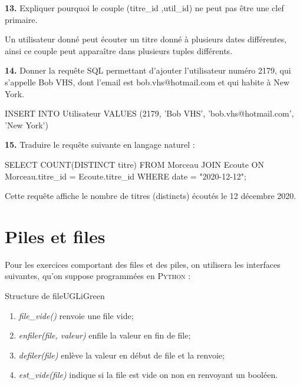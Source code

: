 \documentclass[a4paper,10pt,french]{book}
\begin{document}
    \textbf{13.}	Expliquer pourquoi le couple (titre\_id ,util\_id) ne peut pas être une clef primaire.
    \begin{encadre}[Réponse]
        Un utilisateur donné peut écouter un titre donné à plusieurs dates différentes, ainsi ce couple peut apparaître dans plusieurs tuples différents.
    \end{encadre}
    \textbf{14.}	Donner la requête SQL permettant d’ajouter l’utilisateur numéro 2179, qui s’appelle Bob
    VHS, dont l’email est bob.vhs@hotmail.com et qui habite à New York.
    
    \begin{sql}
        INSERT INTO Utilisateur VALUES 
        (2179, 'Bob VHS', 'bob.vhs@hotmail.com', 'New York')
    \end{sql}
    \textbf{15.}	Traduire le requête suivante en langage naturel :
    \begin{sql}
        SELECT COUNT(DISTINCT titre) FROM Morceau
        JOIN Ecoute ON Morceau.titre_id = Ecoute.titre_id 
        WHERE date = "2020-12-12";
  
    \end{sql}  
    \begin{encadre}[Réponse]
        Cette requête affiche le nombre de titres (distincts) écoutés le 12 décembre 2020.
    \end{encadre}


\section*{Piles et files}

Pour les exercices comportant des files et des piles, on utilisera les interfaces suivantes, qu'on suppose programmées en \textsc{Python} : 

\begin{encadrecolore}{Structure de file}{UGLiGreen}
    \begin{enumerate}[--]
        \item \textit{file\_vide()} renvoie une file vide;
        \item \textit{enfiler(file, valeur)} enfile la valeur en fin de file;
        \item  \textit{defiler(file)} enlève la valeur en début de file et la renvoie;
        \item \textit{est\_vide(file)} indique si la file est vide on non en renvoyant un booléen.
    \end{enumerate}
\end{encadrecolore}
\end{document}
